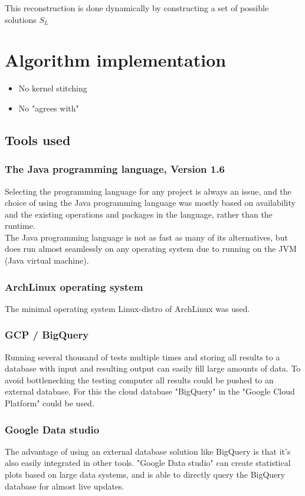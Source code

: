 \documentclass[a4paper]{article}
\begin{document}
This reconstruction is done dynamically by constructing a set of possible solutions $S_L$



%
%
\newpage

\section{Algorithm implementation}
\begin{itemize}
    \item No kernel stitching
    \item No "agrees with"
\end{itemize}
\subsection{Tools used}
\subsubsection{The Java programming language, Version 1.6}
Selecting the programming language for any project is always an issue, and the choice of using
the Java programming language was mostly based on availability and the existing operations
and packages in the language, rather than the runtime.
\\
The Java programming language is not as fast as many of its alternatives, but does run almost
seamlessly on any operating system due to running on the JVM (Java virtual machine).

\subsubsection{ArchLinux operating system}
The minimal operating system Linux-distro of ArchLinux was used.

\subsubsection{GCP / BigQuery}
Running several thousand of tests multiple times and storing all results to a database with
input and resulting output can easily fill large amounts of data. To avoid bottlenecking the
testing computer all results could be pushed to an external database. For this the cloud database
"BigQuery" in the "Google Cloud Platform" could be used.

\subsubsection{Google Data studio}
The advantage of using an external database solution like BigQuery is that it's also easily
integrated in other tools. "Google Data studio" can create statistical plots based on large
data systems, and is able to directly query the BigQuery database for almost live updates.
\end{document}
